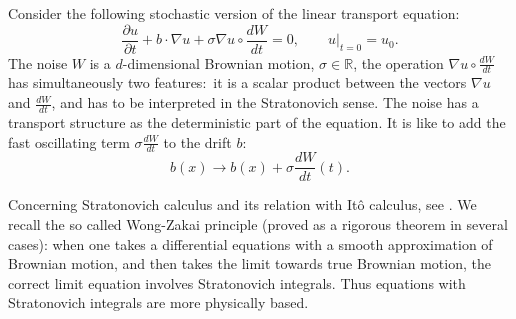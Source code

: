 \documentclass{article}
\begin{document}
Consider the following stochastic version of the linear transport equation:%
\[
\frac{\partial u}{\partial t}+b\cdot\nabla u+\sigma\nabla u\circ\frac{dW}%
{dt}=0,\qquad u|_{t=0}=u_{0}.
\]
The noise $W$ is a $d$-dimensional Brownian motion, $\sigma\in\mathbb{R}$, the
operation $\nabla u\circ\frac{dW}{dt}$ has simultaneously two features:\ it is
a scalar product between the vectors $\nabla u$ and $\frac{dW}{dt}$, and has
to be interpreted in the Stratonovich sense. The noise has a transport
structure as the deterministic part of the equation. It is like to add the
fast oscillating term $\sigma\frac{dW}{dt}$ to the drift $b$:%
\[
b\left(  x\right)  \longrightarrow b\left(  x\right)  +\sigma\frac{dW}%
{dt}\left(  t\right)  .
\]


Concerning Stratonovich calculus and its relation with It\^{o} calculus, see
\cite{K}. We recall the so called Wong-Zakai principle (proved as a rigorous
theorem in several cases): when one takes a differential equations with a
smooth approximation of Brownian motion, and then takes the limit towards true
Brownian motion, the correct limit equation involves Stratonovich integrals.
Thus equations with Stratonovich integrals are more physically based.
\end{document}
